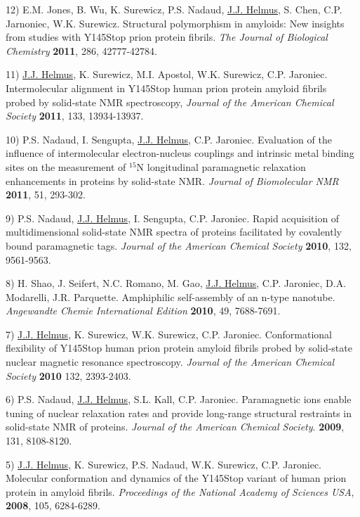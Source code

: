 \documentclass[margin,line]{res}
\begin{document}
\begin{resume}
12) E.M. Jones, B. Wu, K. Surewicz, P.S. Nadaud, \underline{J.J. Helmus}, S. Chen, 
C.P. Jarnoniec, W.K. Surewicz. 
Structural polymorphism in amyloids: New insights from studies with Y145Stop prion protein fibrils.
{\em The Journal of Biological Chemistry} {\bf 2011}, 286, 42777-42784.

11) \underline{J.J. Helmus}, K. Surewicz, M.I. Apostol, W.K. Surewicz, C.P. Jaroniec. 
Intermolecular alignment in Y145Stop human prion protein amyloid fibrils probed by solid-state 
NMR spectroscopy, 
{\em Journal of the American Chemical Society} {\bf 2011}, 133, 13934-13937.

10) P.S. Nadaud, I. Sengupta, \underline{J.J. Helmus}, C.P. Jaroniec.
Evaluation of the influence of intermolecular electron-nucleus couplings and intrinsic metal 
binding sites on the measurement of $^{15}$N longitudinal paramagnetic relaxation enhancements 
in proteins by solid-state NMR. 
{\em Journal of Biomolecular NMR} {\bf 2011}, 51, 293-302.

9) P.S. Nadaud, \underline{J.J. Helmus}, I. Sengupta, C.P. Jaroniec. 
Rapid acquisition of multidimensional solid-state NMR spectra of proteins facilitated by 
covalently bound paramagnetic tags.
{\em Journal of the American Chemical Society} {\bf 2010}, 132, 9561-9563.

8) H. Shao, J. Seifert, N.C. Romano, M. Gao, \underline{J.J. Helmus}, C.P. Jaroniec, 
D.A. Modarelli, J.R. Parquette. 
Amphiphilic self-assembly of an n-type nanotube.
{\em Angewandte Chemie International Edition} {\bf 2010}, 49, 7688-7691. 

7) \underline{J.J. Helmus}, K. Surewicz, W.K. Surewicz, C.P. Jaroniec. 
Conformational flexibility of Y145Stop human prion protein amyloid fibrils probed by 
solid-state nuclear magnetic resonance spectroscopy. 
{\em Journal of the American Chemical Society} {\bf 2010} 132, 2393-2403.

6) P.S. Nadaud, \underline{J.J. Helmus}, S.L. Kall, C.P. Jaroniec. 
Paramagnetic ions enable tuning of nuclear relaxation rates and provide long-range structural 
restraints in solid-state NMR of proteins. 
{\em Journal of the American Chemical Society}. {\bf 2009}, 131, 8108-8120.

5) \underline{J.J. Helmus}, K. Surewicz, P.S. Nadaud, W.K. Surewicz, C.P. Jaroniec. 
Molecular conformation and dynamics of the Y145Stop variant of human prion protein in 
amyloid fibrils.
{\em Proceedings of the National Academy of Sciences USA}, {\bf 2008}, 105, 6284-6289.


\end{resume}
\end{document}
